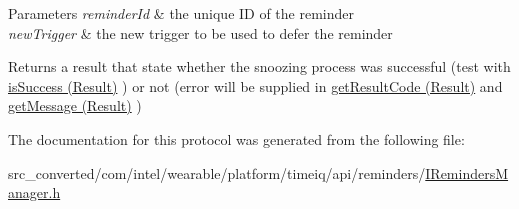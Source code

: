 \begin{DoxyParams}{Parameters}
{\em reminder\+Id} & the unique I\+D of the reminder \\
\hline
{\em new\+Trigger} & the new trigger to be used to defer the reminder \\
\hline
\end{DoxyParams}
\begin{DoxyReturn}{Returns}
a result that state whether the snoozing process was successful (test with \hyperlink{interface_result_a3c3f1b7989edde161fb082fe178290be}{is\+Success (\+Result)} ) or not (error will be supplied in \hyperlink{interface_result_a1aba712f58f0fa0c066db7c8c34d5269}{get\+Result\+Code (\+Result)} and \hyperlink{interface_result_abe56628a08c33b12b2b62d18bd3a0f4f}{get\+Message (\+Result)} ) 
\end{DoxyReturn}


The documentation for this protocol was generated from the following file\+:\begin{DoxyCompactItemize}
\item 
src\+\_\+converted/com/intel/wearable/platform/timeiq/api/reminders/\hyperlink{_i_reminders_manager_8h}{I\+Reminders\+Manager.\+h}\end{DoxyCompactItemize}
